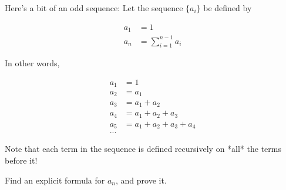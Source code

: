 \begin{problem}
\label{sequence-recursive-sum}

Here's a bit of an odd sequence: Let the sequence $\{a_i\}$ be defined by

\begin{align*}
a_1 &= 1 \\
a_{n} &= \sum_{i=1}^{n-1} a_i
\end{align*}

In other words,

\begin{align*}
a_1 &= 1 \\
a_2 &= a_1 \\
a_3 &= a_1 + a_2 \\
a_4 &= a_1 + a_2 + a_3 \\
a_5 &= a_1 + a_2 + a_3 + a_4 \\
...
\end{align*}

Note that each term in the sequence is defined recursively on *all* the terms before it!

Find an explicit formula for $a_n$, and prove it. 



\end{problem}



